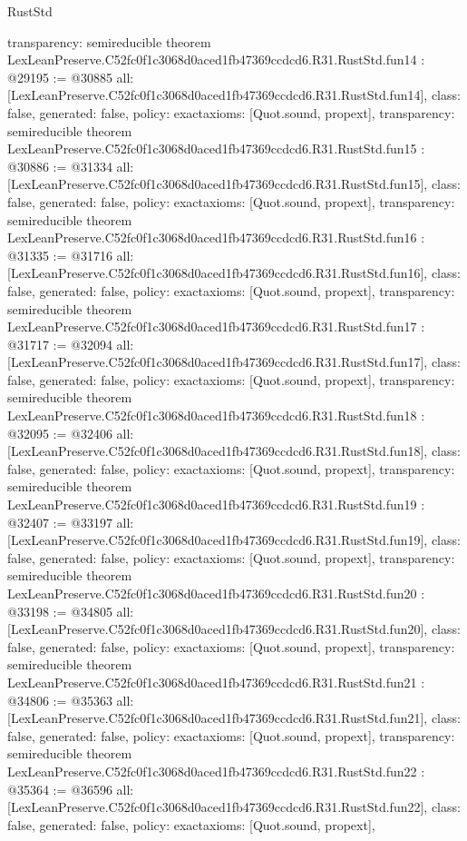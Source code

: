 \begin{lexlean}{RustStd}
\begin{coremodule}
{  transparency: semireducible
}
theorem LexLeanPreserve.C52fc0f1c3068d0aced1fb47369ccdcd6.R31.RustStd.fun14 : @29195 := @30885 {
  all: [LexLeanPreserve.C52fc0f1c3068d0aced1fb47369ccdcd6.R31.RustStd.fun14],
  class: false,
  generated: false,
  policy: exact{axioms: [Quot.sound, propext]},
  transparency: semireducible
}
theorem LexLeanPreserve.C52fc0f1c3068d0aced1fb47369ccdcd6.R31.RustStd.fun15 : @30886 := @31334 {
  all: [LexLeanPreserve.C52fc0f1c3068d0aced1fb47369ccdcd6.R31.RustStd.fun15],
  class: false,
  generated: false,
  policy: exact{axioms: [Quot.sound, propext]},
  transparency: semireducible
}
theorem LexLeanPreserve.C52fc0f1c3068d0aced1fb47369ccdcd6.R31.RustStd.fun16 : @31335 := @31716 {
  all: [LexLeanPreserve.C52fc0f1c3068d0aced1fb47369ccdcd6.R31.RustStd.fun16],
  class: false,
  generated: false,
  policy: exact{axioms: [Quot.sound, propext]},
  transparency: semireducible
}
theorem LexLeanPreserve.C52fc0f1c3068d0aced1fb47369ccdcd6.R31.RustStd.fun17 : @31717 := @32094 {
  all: [LexLeanPreserve.C52fc0f1c3068d0aced1fb47369ccdcd6.R31.RustStd.fun17],
  class: false,
  generated: false,
  policy: exact{axioms: [Quot.sound, propext]},
  transparency: semireducible
}
theorem LexLeanPreserve.C52fc0f1c3068d0aced1fb47369ccdcd6.R31.RustStd.fun18 : @32095 := @32406 {
  all: [LexLeanPreserve.C52fc0f1c3068d0aced1fb47369ccdcd6.R31.RustStd.fun18],
  class: false,
  generated: false,
  policy: exact{axioms: [Quot.sound, propext]},
  transparency: semireducible
}
theorem LexLeanPreserve.C52fc0f1c3068d0aced1fb47369ccdcd6.R31.RustStd.fun19 : @32407 := @33197 {
  all: [LexLeanPreserve.C52fc0f1c3068d0aced1fb47369ccdcd6.R31.RustStd.fun19],
  class: false,
  generated: false,
  policy: exact{axioms: [Quot.sound, propext]},
  transparency: semireducible
}
theorem LexLeanPreserve.C52fc0f1c3068d0aced1fb47369ccdcd6.R31.RustStd.fun20 : @33198 := @34805 {
  all: [LexLeanPreserve.C52fc0f1c3068d0aced1fb47369ccdcd6.R31.RustStd.fun20],
  class: false,
  generated: false,
  policy: exact{axioms: [Quot.sound, propext]},
  transparency: semireducible
}
theorem LexLeanPreserve.C52fc0f1c3068d0aced1fb47369ccdcd6.R31.RustStd.fun21 : @34806 := @35363 {
  all: [LexLeanPreserve.C52fc0f1c3068d0aced1fb47369ccdcd6.R31.RustStd.fun21],
  class: false,
  generated: false,
  policy: exact{axioms: [Quot.sound, propext]},
  transparency: semireducible
}
theorem LexLeanPreserve.C52fc0f1c3068d0aced1fb47369ccdcd6.R31.RustStd.fun22 : @35364 := @36596 {
  all: [LexLeanPreserve.C52fc0f1c3068d0aced1fb47369ccdcd6.R31.RustStd.fun22],
  class: false,
  generated: false,
  policy: exact{axioms: [Quot.sound, propext]},
}
\end{coremodule}
\end{lexlean}
